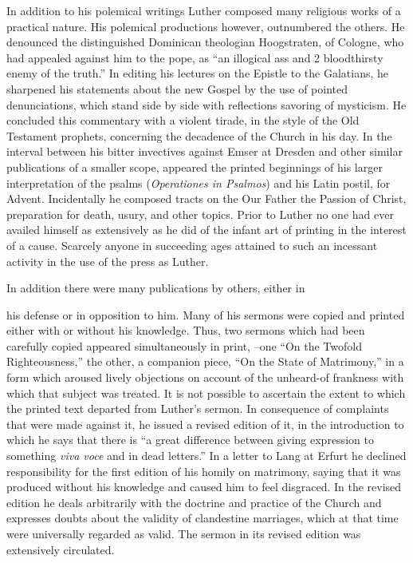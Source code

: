 In addition to his polemical writings Luther composed many religious
works of a practical nature. His polemical productions however, outnumbered
the others. He denounced the distinguished Dominican
theologian Hoogstraten, of Cologne, who had appealed
against him to the pope, as “an illogical ass and 2 bloodthirsty enemy
of the truth.” In editing his lectures on the Epistle to the Galatians,
he sharpened his statements about the new Gospel by the use
of pointed denunciations, which stand side by side with reflections savoring
of mysticism. He concluded this commentary with a violent tirade,
in the style of the Old Testament prophets, concerning the decadence
of the Church in his day. In the interval between his bitter invectives
against Emser at Dresden and other similar publications of a smaller
scope, appeared the printed beginnings of his larger interpretation
of the psalms (\textit{Operationes in Psalmos}) and his Latin postil, for
Advent. Incidentally he composed tracts on the Our Father the
Passion of Christ, preparation for death, usury, and other topics.
Prior to Luther no one had ever availed himself as extensively as he
did of the infant art of printing in the interest of a cause. Scarcely
anyone in succeeding ages attained to such an incessant activity in
the use of the press as Luther.

In addition there were many publications by others, either in

his defense or in opposition to him. Many of his sermons were copied
and printed either with or without his knowledge. Thus, two sermons
which had been carefully copied appeared simultaneously in print,
--one “On the Twofold Righteousness,” the other, a companion
piece, “On the State of Matrimony,” in a form which aroused lively
objections on account of the unheard-of frankness with which
that subject was treated. It is not possible to ascertain the extent to
which the printed text departed from Luther’s sermon. In consequence of
complaints that were made against it, he issued a revised
edition of it, in the introduction to which he says that there is “a
great difference between giving expression to something \textit{viva voce}
and in dead letters.” In a letter to Lang at Erfurt he declined responsibility
for the first edition of his homily on matrimony, saying that
it was produced without his knowledge and caused him to feel disgraced.
In the revised edition he deals arbitrarily with the doctrine
and practice of the Church and expresses doubts about the validity
of clandestine marriages, which at that time were universally regarded
as valid. The sermon in its revised edition was extensively
circulated.

